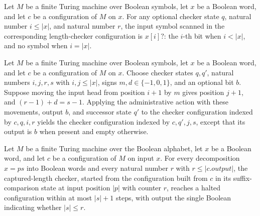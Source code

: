 \begin{lemma}
\label{Turing.FinTM.lenCfg_read}
\leanok
{}
Let $M$ be a finite Turing machine over Boolean symbols, let $x$ be a Boolean word, and
let $c$ be a configuration of $M$ on $x$. For any optional checker state $q$, natural
number $i\le |x|$, and natural number $r$, the input symbol scanned in the corresponding
length-checker configuration is $x[i]?$: the $i$-th bit when $i<|x|$, and no symbol when
$i=|x|$.
\end{lemma}

\begin{lemma}
\label{Turing.FinTM.lenAction_apply}
\leanok
{}
Let $M$ be a finite Turing machine over Boolean symbols, let $x$ be a Boolean word, and
let $c$ be a configuration of $M$ on $x$. Choose checker states $q,q'$, natural numbers
$i,j,r,s$ with $i,j\le |x|$, signs $m,d\in\{-1,0,1\}$, and an optional bit $b$. Suppose
moving the input head from position $i+1$ by $m$ gives position $j+1$, and
$(r-1)+d=s-1$. Applying the administrative action with these movements, output $b$, and
successor state $q'$ to the checker configuration indexed by $c,q,i,r$ yields the
checker configuration indexed by $c,q',j,s$, except that its output is $b$ when present
and empty otherwise.
\end{lemma}

\begin{lemma}
\label{Turing.FinTM.lenSuffix_run}
\leanok
{}
Let $M$ be a finite Turing machine over the Boolean alphabet, let $x$ be a Boolean word,
and let $c$ be a configuration of $M$ on input $x$. For every decomposition $x=ps$ into
Boolean words and every natural number $r$ with $r\le |c.output|$, the captured-length
checker, started from the configuration built from $c$ in its suffix-comparison state at
input position $|p|$ with counter $r$, reaches a halted configuration within at most
$|s|+1$ steps, with output the single Boolean indicating whether $|s|\le r$.
\end{lemma}

